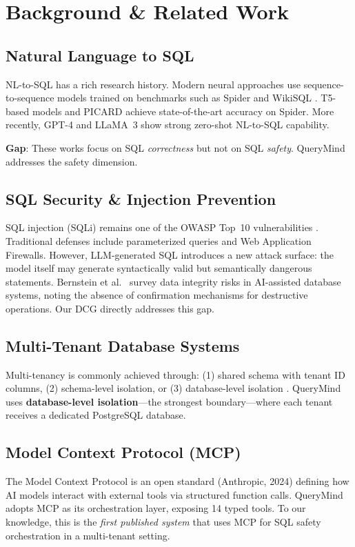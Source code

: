 \documentclass[conference]{IEEEtran}
\begin{document}
\section{Background \& Related Work}

\subsection{Natural Language to SQL}
NL-to-SQL has a rich research history. Modern neural approaches use sequence-to-sequence models trained on benchmarks such as Spider \cite{yu2018spider} and WikiSQL \cite{zhong2017seq2sql}. T5-based models \cite{raffel2020t5} and PICARD \cite{scholak2021picard} achieve state-of-the-art accuracy on Spider. More recently, GPT-4 \cite{openai2023gpt4} and LLaMA~3 \cite{dubey2024llama3} show strong zero-shot NL-to-SQL capability.

\textbf{Gap}: These works focus on SQL \emph{correctness} but not on SQL \emph{safety}. QueryMind addresses the safety dimension.

\subsection{SQL Security \& Injection Prevention}
SQL injection (SQLi) remains one of the OWASP Top~10 vulnerabilities \cite{owasp2021}. Traditional defenses include parameterized queries \cite{anley2002sqli} and Web Application Firewalls. However, LLM-generated SQL introduces a new attack surface: the model itself may generate syntactically valid but semantically dangerous statements. Bernstein et al.\ \cite{bernstein2023integrity} survey data integrity risks in AI-assisted database systems, noting the absence of confirmation mechanisms for destructive operations. Our DCG directly addresses this gap.

\subsection{Multi-Tenant Database Systems}
Multi-tenancy is commonly achieved through: (1) shared schema with tenant ID columns, (2) schema-level isolation, or (3) database-level isolation \cite{chong2006multitenancy}. QueryMind uses \textbf{database-level isolation}—the strongest boundary—where each tenant receives a dedicated PostgreSQL database.

\subsection{Model Context Protocol (MCP)}
The Model Context Protocol \cite{anthropic2024mcp} is an open standard (Anthropic, 2024) defining how AI models interact with external tools via structured function calls. QueryMind adopts MCP as its orchestration layer, exposing 14 typed tools. To our knowledge, this is the \emph{first published system} that uses MCP for SQL safety orchestration in a multi-tenant setting.
\end{document}
